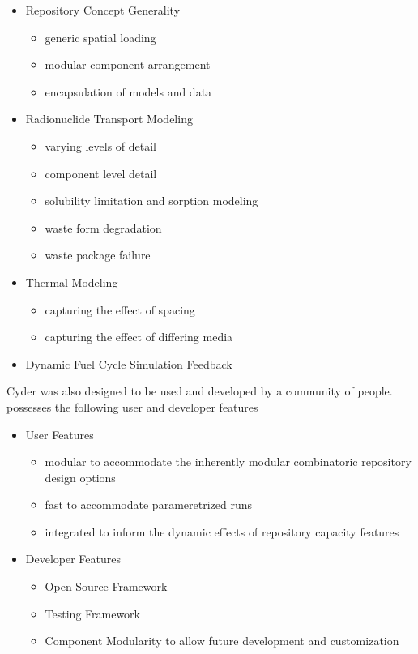 \begin{itemize}
  \item Repository Concept Generality
    \begin{itemize}
      \item generic spatial loading
      \item modular component arrangement
      \item encapsulation of models and data
    \end{itemize}
  \item Radionuclide Transport Modeling 
    \begin{itemize}
      \item varying levels of detail
      \item component level detail
      \item solubility limitation and sorption modeling
      \item waste form degradation
      \item waste package failure
    \end{itemize}
  \item Thermal Modeling
    \begin{itemize}
      \item capturing the effect of spacing
      \item capturing the effect of differing media
    \end{itemize}
  \item Dynamic Fuel Cycle Simulation Feedback
\end{itemize}

Cyder was also designed to be used and developed by a community of people. \Cyder possesses the following user and developer features
\begin{itemize}
  \item User Features
    \begin{itemize}
      \item modular to accommodate the inherently modular combinatoric repository design options
      \item fast to accommodate parameretrized runs
      \item integrated to inform the dynamic effects of repository capacity features
    \end{itemize}
  \item Developer Features
    \begin{itemize}
      \item Open Source Framework
      \item Testing Framework
      \item Component Modularity to allow future development and customization
    \end{itemize}
\end{itemize}

